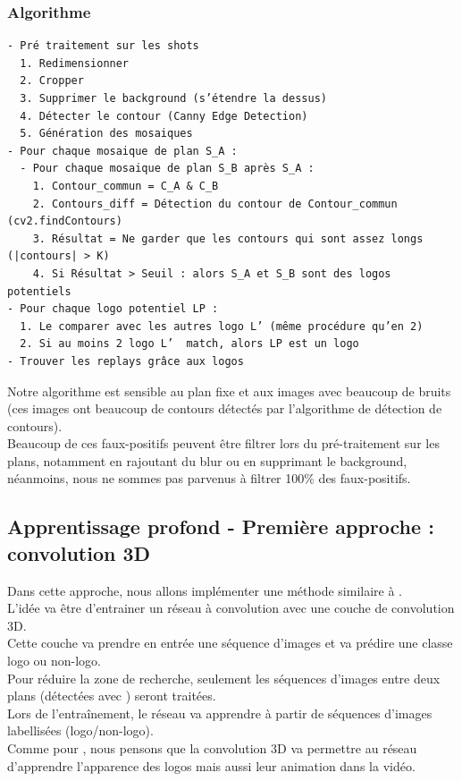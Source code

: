 \documentclass[11pt]{article}
\begin{document}
\subsubsection{Algorithme}
\label{sec:org9eda1be}
\begin{verbatim}
- Pré traitement sur les shots
  1. Redimensionner
  2. Cropper
  3. Supprimer le background (s’étendre la dessus)
  4. Détecter le contour (Canny Edge Detection)
  5. Génération des mosaiques
- Pour chaque mosaique de plan S_A :
  - Pour chaque mosaique de plan S_B après S_A :
    1. Contour_commun = C_A & C_B
    2. Contours_diff = Détection du contour de Contour_commun (cv2.findContours)
    3. Résultat = Ne garder que les contours qui sont assez longs (|contours| > K)
    4. Si Résultat > Seuil : alors S_A et S_B sont des logos potentiels
- Pour chaque logo potentiel LP :
  1. Le comparer avec les autres logo L’ (même procédure qu’en 2)
  2. Si au moins 2 logo L’  match, alors LP est un logo
- Trouver les replays grâce aux logos
\end{verbatim}

Notre algorithme est sensible au plan fixe et aux images avec beaucoup de bruits (ces images ont beaucoup de contours détectés par l’algorithme de détection de contours).\\
Beaucoup de ces faux-positifs peuvent être filtrer lors du pré-traitement sur les plans, notamment en rajoutant du blur ou en supprimant le background, néanmoins, nous ne sommes pas parvenus à filtrer 100\% des faux-positifs.\\

\subsection{Apprentissage profond - Première approche : convolution 3D}
\label{sec:org0553e97}
Dans cette approche, nous allons implémenter une méthode similaire à \cite{Tran_2015}.\\
L'idée va être d'entrainer un réseau à convolution avec une couche de convolution 3D.\\
Cette couche va prendre en entrée une séquence d'images et va prédire une classe logo ou non-logo.\\
Pour réduire la zone de recherche, seulement les séquences d'images entre deux plans (détectées avec \cite{Abd_Almageed_2008}) seront traitées.\\
Lors de l'entraînement, le réseau va apprendre à partir de séquences d'images labellisées (logo/non-logo).\\
Comme pour \cite{Tran_2015}, nous pensons que la convolution 3D va permettre au réseau d'apprendre l'apparence des logos mais aussi leur animation dans la vidéo.\\
\end{document}

